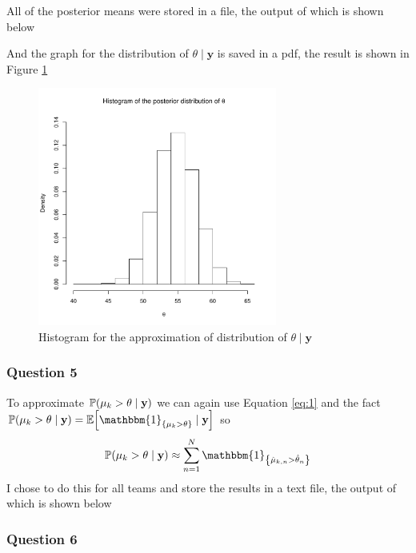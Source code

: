 \documentclass[11pt]{article} %
\let\originalleft\left
\let\originalright\right
\renewcommand{\left}{\mathopen{}\mathclose\bgroup\originalleft}
\renewcommand{\right}{\aftergroup\egroup\originalright}
\begin{document}
All of the posterior means were stored in a file, the output of which is shown below


And the graph for the distribution of $\theta \mid \mathbf{y}$ is saved in a pdf, the result is shown in Figure \ref{fig:post_theta_dist}
\begin{figure}[h]
	\centering
	\includegraphics[width=0.7\textwidth]{"../R File/post_theta_dist"}
	\caption{Histogram for the approximation of distribution of  $\theta \mid \mathbf{y}$}
	\label{fig:post_theta_dist}
\end{figure}

\subsubsection*{Question 5}
To approximate $\mathbb{P}\left(\mu_k > \theta \mid \mathbf{y}\right)$ we can again use Equation \ref{eq:1} and the fact $\mathbb{P}\left(\mu_k > \theta \mid \mathbf{y}\right) = \mathbb{E}\left[\mathbbm{1}_{\left\{\mu_k > \theta\right\}} \mid \mathbf{y}\right]$ so
$$ \mathbb{P}\left(\mu_k > \theta \mid \mathbf{y}\right) \approx  \sum_{n=1}^{N}{\mathbbm{1}_{\left\{\hat{\mu}_{k, n}>\hat{\theta}_n\right\}}}$$
I chose to do this for all teams and store the results in a text file, the output of which is shown below


\subsubsection*{Question 6}
\end{document}

